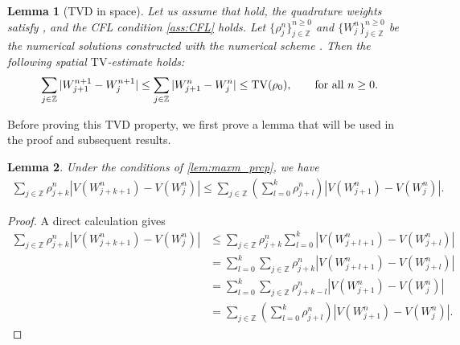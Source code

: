 \documentclass[10pt]{amsart}
\theoremstyle{plain}
\newtheorem{lemma}{Lemma}[section]
\theoremstyle{definition}
\numberwithin{equation}{section}
\begin{document}
\begin{lemma}[TVD in space]\label{lm:TVD-x-2}
Let us assume that  hold, the quadrature weights satisfy , and the CFL condition \cref{ass:CFL} holds. Let $\{\rho_j^n\}_{j\in\mathbb{Z}}^{n\geq0}$ and $\{W_j^n\}_{j\in\mathbb{Z}}^{n\geq0}$ be the numerical solutions constructed with the numerical scheme . Then the following spatial $\mathrm{TV}$-estimate holds: 
\begin{align}\label{eq:TVD-x-2}
\sum_{j\in\mathbb{Z}} |W_{j+1}^{n+1}-W_j^{n+1}| \le \sum_{j\in\mathbb{Z}} |W_{j+1}^n-W_j^n| \leq \mathrm{TV}(\rho_0), \qquad \textnormal{for all $n\ge0$.}
\end{align}
\end{lemma}

Before proving this TVD property, we first prove a lemma that will be used in the proof and subsequent results.

\begin{lemma}\label{lm:use_for_tv}
Under the conditions of \cref{lem:maxm_prcp}, we have
\begin{align}\label{eq:TV-p1}
    \sum_{j\in\mathbb{Z}}\rho_{j+k}^n |V(W_{j+k+1}^n) -V(W_j^n)| \leq \sum_{j\in\mathbb{Z}} \left(\sum_{l=0}^k \rho_{j+l}^n\right) |V(W_{j+1}^n) -V(W_j^n)|.
\end{align}
\end{lemma}

\begin{proof}
A direct calculation gives
    \begin{align*}
    \sum_{j\in\mathbb{Z}}\rho_{j+k}^n |V(W_{j+k+1}^n) -V(W_j^n)| &\leq \sum_{j\in\mathbb{Z}}\rho_{j+k}^n \sum_{l=0}^k |V(W_{j+l+1}^n) -V(W_{j+l}^n)| \\
    &= \sum_{l=0}^k \sum_{j\in\mathbb{Z}} \rho_{j+k}^n |V(W_{j+l+1}^n) -V(W_{j+l}^n)| \\
    &= \sum_{l=0}^k \sum_{j\in\mathbb{Z}} \rho_{j+k-l}^n |V(W_{j+1}^n) -V(W_j^n)|  \\
    &= \sum_{j\in\mathbb{Z}} \left(\sum_{l=0}^k \rho_{j+l}^n\right) |V(W_{j+1}^n) -V(W_j^n)|. 
\end{align*}
\end{proof}
\end{document}
